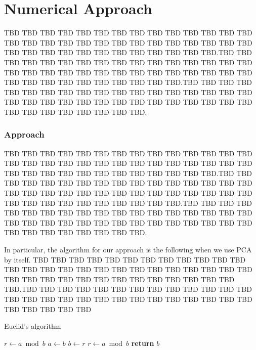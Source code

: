\documentclass[conference]{IEEEtran}
\begin{document}
\section{Numerical Approach}

TBD TBD TBD TBD TBD TBD TBD TBD TBD TBD TBD TBD TBD TBD TBD TBD TBD TBD TBD TBD TBD TBD TBD TBD TBD TBD TBD TBD TBD TBD TBD TBD TBD TBD TBD TBD TBD TBD TBD TBD.TBD TBD TBD TBD TBD TBD TBD TBD TBD TBD TBD TBD TBD TBD TBD TBD TBD TBD TBD TBD TBD TBD TBD TBD TBD TBD TBD TBD TBD TBD TBD TBD TBD TBD TBD TBD TBD TBD TBD TBD.TBD TBD TBD TBD TBD TBD TBD TBD TBD TBD TBD TBD TBD TBD TBD TBD TBD TBD TBD TBD TBD TBD TBD TBD TBD TBD TBD TBD TBD TBD TBD TBD TBD TBD TBD TBD TBD TBD TBD TBD.

\subsubsection{Approach}

TBD TBD TBD TBD TBD TBD TBD TBD TBD TBD TBD TBD TBD TBD TBD TBD TBD TBD TBD TBD TBD TBD TBD TBD TBD TBD TBD TBD TBD TBD TBD TBD TBD TBD TBD TBD TBD TBD TBD TBD.TBD TBD TBD TBD TBD TBD TBD TBD TBD TBD TBD TBD TBD TBD TBD TBD TBD TBD TBD TBD TBD TBD TBD TBD TBD TBD TBD TBD TBD TBD TBD TBD TBD TBD TBD TBD TBD TBD TBD TBD.TBD TBD TBD TBD TBD TBD TBD TBD TBD TBD TBD TBD TBD TBD TBD TBD TBD TBD TBD TBD TBD TBD TBD TBD TBD TBD TBD TBD TBD TBD TBD TBD TBD TBD TBD TBD TBD TBD TBD TBD.


In particular, the algorithm for our approach is the following when we use PCA by itself.  TBD TBD TBD TBD TBD TBD TBD TBD TBD TBD TBD TBD TBD TBD TBD TBD TBD TBD TBD TBD TBD TBD TBD TBD TBD TBD TBD TBD TBD TBD TBD TBD TBD TBD TBD TBD TBD TBD TBD TBD.TBD TBD TBD TBD TBD TBD TBD TBD TBD TBD TBD TBD TBD TBD TBD TBD TBD TBD TBD TBD TBD TBD TBD TBD TBD TBD TBD TBD TBD TBD TBD TBD

\begin{algorithm}
\caption{Euclid’s algorithm}\label{alg:euclid}
\begin{algorithmic}[1]
\State $r\gets a\bmod b$
\State $a\gets b$
\State $b\gets r$
\State $r\gets a\bmod b$
\EndWhile\label{euclidendwhile}
\State \textbf{return} $b$
\EndProcedure
\end{algorithmic}
\end{algorithm}
\end{document}
